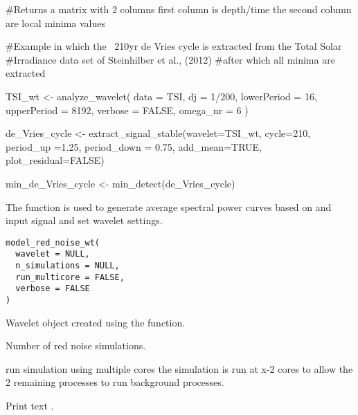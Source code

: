 \documentclass[a4paper]{book}
\begin{document}
%
\begin{Value}
\#Returns a matrix with 2 columns
first column is depth/time
the second column are local minima values
\end{Value}
%
\begin{Examples}
\begin{ExampleCode}
#Example in which the ~210yr de Vries cycle is extracted from the Total Solar
#Irradiance data set of Steinhilber et al., (2012)
#after which all minima are extracted

TSI_wt <-
analyze_wavelet(
data = TSI,
dj = 1/200,
lowerPeriod = 16,
upperPeriod = 8192,
   verbose = FALSE,
   omega_nr = 6
 )

de_Vries_cycle <- extract_signal_stable(wavelet=TSI_wt,
cycle=210,
period_up =1.25,
period_down = 0.75,
add_mean=TRUE,
plot_residual=FALSE)


min_de_Vries_cycle <- min_detect(de_Vries_cycle)

\end{ExampleCode}
\end{Examples}
%
\begin{Description}
The  function is used to generate
average spectral power curves based on and input signal and set wavelet settings.
\end{Description}
%
\begin{Usage}
\begin{verbatim}
model_red_noise_wt(
  wavelet = NULL,
  n_simulations = NULL,
  run_multicore = FALSE,
  verbose = FALSE
)
\end{verbatim}
\end{Usage}
%
\begin{Arguments}
\begin{ldescription}
\item[\code{wavelet}] Wavelet object created using the  function.

\item[\code{n\_simulations}] Number of red noise simulations.

\item[\code{run\_multicore}] run simulation using multiple cores 
the simulation is run at x-2 cores to allow the 2 remaining processes to run background processes.

\item[\code{verbose}] Print text .
\end{ldescription}
\end{Arguments}
\end{document}
